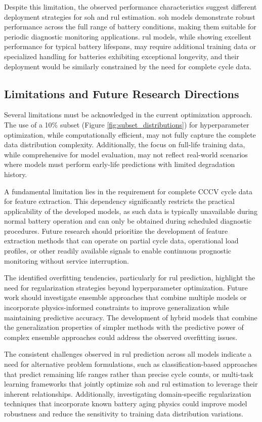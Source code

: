 Despite this limitation, the observed performance characteristics suggest different deployment strategies for \ac{soh} and \ac{rul} estimation. \ac{soh} models demonstrate robust performance across the full range of battery conditions, making them suitable for periodic diagnostic monitoring applications. \ac{rul} models, while showing excellent performance for typical battery lifespans, may require additional training data or specialized handling for batteries exhibiting exceptional longevity, and their deployment would be similarly constrained by the need for complete cycle data.

\subsection{Limitations and Future Research Directions}

Several limitations must be acknowledged in the current optimization approach. The use of a 10\% subset (Figure \ref{fig:subset_distributions}) for hyperparameter optimization, while computationally efficient, may not fully capture the complete data distribution complexity. Additionally, the focus on full-life training data, while comprehensive for model evaluation, may not reflect real-world scenarios where models must perform early-life predictions with limited degradation history.

A fundamental limitation lies in the requirement for complete CCCV cycle data for feature extraction. This dependency significantly restricts the practical applicability of the developed models, as such data is typically unavailable during normal battery operation and can only be obtained during scheduled diagnostic procedures. Future research should prioritize the development of feature extraction methods that can operate on partial cycle data, operational load profiles, or other readily available signals to enable continuous prognostic monitoring without service interruption.

The identified overfitting tendencies, particularly for \ac{rul} prediction, highlight the need for regularization strategies beyond hyperparameter optimization. Future work should investigate ensemble approaches that combine multiple models or incorporate physics-informed constraints to improve generalization while maintaining predictive accuracy. The development of hybrid models that combine the generalization properties of simpler methods with the predictive power of complex ensemble approaches could address the observed overfitting issues.

The consistent challenges observed in \ac{rul} prediction across all models indicate a need for alternative problem formulations, such as classification-based approaches that predict remaining life ranges rather than precise cycle counts, or multi-task learning frameworks that jointly optimize \ac{soh} and \ac{rul} estimation to leverage their inherent relationships. Additionally, investigating domain-specific regularization techniques that incorporate known battery aging physics could improve model robustness and reduce the sensitivity to training data distribution variations.
